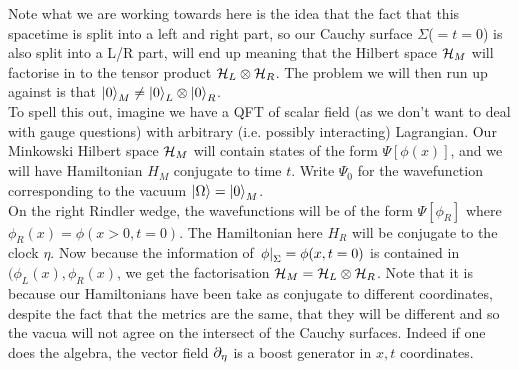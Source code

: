 \documentclass{article}
\begin{document}
\begin{remark}
	Note what we are working towards here is the idea that the fact that this spacetime is split into a left and right part, so our Cauchy surface $\Sigma$($=t=0$) is also split into a L/R part, will end up meaning that the Hilbert space $\mathcal{H}_M$ will factorise in to the tensor product $\mathcal{H}_L \otimes \mathcal{H}_R$. The problem we will then run up against is that $\ket{0}_M \neq \ket{0}_L \otimes \ket{0}_R$. \\
	To spell this out, imagine we have a QFT of scalar field (as we don't want to deal with gauge questions) with arbitrary (i.e. possibly interacting) Lagrangian. Our Minkowski Hilbert space $\mathcal{H}_M$ will contain states of the form $\Psi[\phi(x)]$, and we will have Hamiltonian $H_M$ conjugate to time $t$. Write $\Psi_0$ for the wavefunction corresponding to the vacuum $\ket{\Omega} = \ket{0}_M$. \\
	On the right Rindler wedge, the wavefunctions will be of the form $\Psi[\phi_R]$ where $\phi_R(x) = \phi(x>0, t=0)$. The Hamiltonian here $H_R$ will be conjugate to the clock $\eta$. Now because the information of $\left. \phi \right\rvert_{\Sigma} = \phi(x,t=0)$ is contained in $(\phi_L(x), \phi_R(x)$, we get the factorisation $\mathcal{H}_M = \mathcal{H}_L \otimes \mathcal{H}_R$. Note that it is because our Hamiltonians have been take as conjugate to different coordinates, despite the fact that the metrics are the same, that they will be different and so the vacua will not agree on the intersect of the Cauchy surfaces. Indeed if one does the algebra, the vector field $\partial_\eta$ is a boost generator in $x,t$ coordinates. 
\end{remark}

\end{document}
